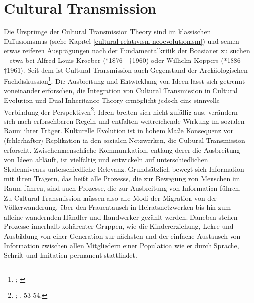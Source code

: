 \documentclass[openany,twoside,twocolumn]{book}
\let\rmarkdownfootnote\footnote%
\def\footnote{\protect\rmarkdownfootnote}
\begin{document}
\hypertarget{cultural-transmission}{%
\section{Cultural Transmission}\label{cultural-transmission}}

Die Ursprünge der Cultural Transmission Theory sind im klassischen
Diffusionismus (siehe Kapitel \ref{cultural-relativism-neoevolutionism})
und seinen etwas reiferen Ausprägungen nach der Fundamentalkritik der
Boasianer zu suchen -- etwa bei Alfred Louis Kroeber (*1876 - †1960)
oder Wilhelm Koppers (*1886 - †1961). Seit dem ist Cultural Transmission
auch Gegenstand der Archäologischen Fachdiskussion\footnote{\textcite{lyman_cultural_2008};
  \textcite{shennan_evolution_2008}}. Die Ausbreitung und Entwicklung
von Ideen lässt sich getrennt voneinander erforschen, die Integration
von Cultural Transmission in Cultural Evolution und Dual Inheritance
Theory ermöglicht jedoch eine sinnvolle Verbindung der
Perspektiven\footnote{\textcite{eerkens_cultural_2007};
  \textcite{cavalli-sforza_cultural_1981}, 53-54.}: Ideen breiten sich
nicht zufällig aus, verändern sich nach erforschbaren Regeln und
entfalten weitreichende Wirkung im sozialen Raum ihrer Träger.
Kulturelle Evolution ist in hohem Maße Konsequenz von (fehlerhafter)
Replikation in den sozialen Netzwerken, die Cultural Transmission
erforscht. Zwischenmenschliche Kommunikation, entlang derer die
Ausbreitung von Ideen abläuft, ist vielfältig und entwickeln auf
unterschiedlichen Skalenniveaus unterschiedliche Relevanz. Grundsätzlich
bewegt sich Information mit ihren Trägern, das heißt alle Prozesse, die
zur Bewegung von Menschen im Raum führen, sind auch Prozesse, die zur
Ausbreitung von Information führen. Zu Cultural Transmission müssen also
alle Modi der Migration von der Völkerwanderung, über den Frauentausch
in Heiratsnetzwerken bis hin zum alleine wandernden Händler und
Handwerker gezählt werden. Daneben stehen Prozesse innerhalb kohärenter
Gruppen, wie die Kindererziehung, Lehre und Ausbildung von einer
Generation zur nächsten und der einfache Austausch von Information
zwischen allen Mitgliedern einer Population wie er durch Sprache,
Schrift und Imitation permanent stattfindet.
\end{document}
